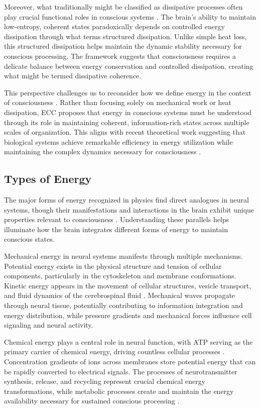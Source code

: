 Moreover, what traditionally might be classified as dissipative processes often play crucial functional roles in conscious systems \cite{Nicolis1977}. The brain's ability to maintain low-entropy, coherent states paradoxically depends on controlled energy dissipation through what \cite{Prigogine1978} terms structured dissipation. Unlike simple heat loss, this structured dissipation helps maintain the dynamic stability necessary for conscious processing. The framework suggests that consciousness requires a delicate balance between energy conservation and controlled dissipation, creating what might be termed dissipative coherence.

This perspective challenges us to reconsider how we define energy in the context of consciousness \cite{Demetrius2015}. Rather than focusing solely on mechanical work or heat dissipation, ECC proposes that energy in conscious systems must be understood through its role in maintaining coherent, information-rich states across multiple scales of organization. This aligns with recent theoretical work suggesting that biological systems achieve remarkable efficiency in energy utilization while maintaining the complex dynamics necessary for consciousness \cite{Laughlin2005}.

\subsection{Types of Energy}

The major forms of energy recognized in physics find direct analogues in neural systems, though their manifestations and interactions in the brain exhibit unique properties relevant to consciousness \cite{Atkins2010}. Understanding these parallels helps illuminate how the brain integrates different forms of energy to maintain conscious states.

Mechanical energy in neural systems manifests through multiple mechanisms. Potential energy exists in the physical structure and tension of cellular components, particularly in the cytoskeleton and membrane conformations. Kinetic energy appears in the movement of cellular structures, vesicle transport, and fluid dynamics of the cerebrospinal fluid \cite{Shulman2013}. Mechanical waves propagate through neural tissue, potentially contributing to information integration and energy distribution, while pressure gradients and mechanical forces influence cell signaling and neural activity.

Chemical energy plays a central role in neural function, with ATP serving as the primary carrier of chemical energy, driving countless cellular processes \cite{Qian2007}. Concentration gradients of ions across membranes store potential energy that can be rapidly converted to electrical signals. The processes of neurotransmitter synthesis, release, and recycling represent crucial chemical energy transformations, while metabolic processes create and maintain the energy availability necessary for sustained conscious processing \cite{Demetrius2015}.

